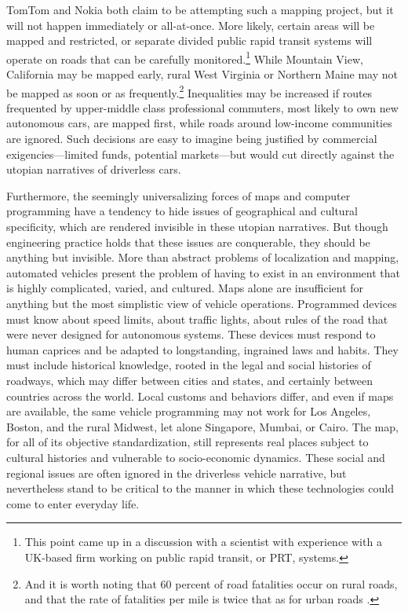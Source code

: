 TomTom \cite{tomtommaps} and Nokia \cite{ubergizmo} both claim to be attempting such
a mapping project,
but it will not happen immediately or all-at-once. More likely,
certain areas will be 
mapped and restricted, or separate divided public rapid transit
systems will operate on roads that can be carefully
monitored.\footnote{This point came up in a discussion with a
  scientist with experience with a UK-based firm working on public
  rapid transit, or PRT, systems.} While
Mountain View, California may be mapped early, rural West Virginia or
Northern Maine may not be mapped as soon or as
frequently.\footnote{And it is worth noting that 60 percent of road
  fatalities occur on rural roads, and that the rate of fatalities per
mile is twice that as for urban roads \cite[p. 11]{broviakCars}.}
Inequalities may be increased if routes frequented by upper-middle
class professional commuters, most likely to own new autonomous cars,
are mapped first, while roads around low-income communities are
ignored. Such decisions are easy to imagine being justified by
commercial exigencies---limited funds, potential markets---but would
cut directly against the utopian narratives of driverless cars.

Furthermore, the seemingly universalizing forces of maps and computer programming
have a tendency to hide issues of geographical and cultural
specificity, which are rendered invisible in these utopian narratives.
But though engineering practice holds that these issues are
conquerable, they should be anything but invisible. More than
abstract problems of localization and mapping, automated vehicles
present the problem of having to exist in an environment that is
highly complicated, varied, and cultured. Maps alone are insufficient
for anything but the most simplistic view of vehicle operations.
Programmed devices
must know about speed limits, about traffic
lights, about rules of the road that were never designed for
autonomous systems. These devices must respond to human caprices and
be adapted to longstanding, ingrained laws and habits. They must
include historical knowledge, rooted in the legal and social histories
of roadways, which may differ between cities and states, and certainly
between countries across the world. Local customs and behaviors differ, and even if maps are
available, the same vehicle programming may not work for Los Angeles,
Boston, and the rural Midwest, let alone Singapore, Mumbai, or Cairo.
The map, for all of its objective standardization, still represents
real places subject to cultural histories and vulnerable to
socio-economic dynamics. These social and regional issues are often
ignored in the driverless vehicle narrative, but nevertheless stand to
be critical to the manner in which these technologies could come to
enter everyday life.




